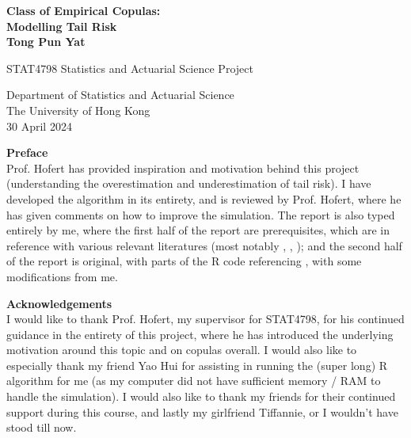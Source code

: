 \documentclass[12pt]{report}
\newcommand{\1}{\mathbf{1}}
\begin{document}
\begin{titlepage}
   \begin{center}
       \vspace*{1cm}
        \huge
       \textbf{Class of Empirical Copulas:} \\
       \huge
       \textbf{Modelling Tail Risk} \\
       \vspace{2cm}
        \LARGE
       \textbf{Tong Pun Yat}

       
        
       \vspace{7.0cm}
       \Large
       STAT4798 Statistics and Actuarial Science Project
            
       \vspace{0.8cm}
            
       Department of Statistics and Actuarial Science\\
       The University of Hong Kong\\
       30 April 2024
            
   \end{center}

\end{titlepage}

\newpage
\begin{flushleft}
\LARGE
\textbf{Preface} \\
\normalsize
\vspace{1cm}
Prof. Hofert has provided inspiration and motivation behind this project (understanding the overestimation and underestimation of tail risk). I have developed the algorithm in its entirety, and is reviewed by Prof. Hofert, where he has given comments on how to improve the simulation. The report is also typed entirely by me, where the first half of the report are prerequisites, which are in reference with various relevant literatures (most notably \cite{HofertBook}, \cite{KojadinovicYi2024Smooth}, \cite{SegersEBC}); and the second half of the report is original, with parts of the R code referencing \cite{copulaRPackage2023}, \cite{KojadinovicYi2024Smooth} with some modifications from me. 
\end{flushleft}

\newpage
\begin{flushleft}
\LARGE
\textbf{Acknowledgements} \\
\normalsize
\vspace{1cm}
I would like to thank Prof. Hofert, my supervisor for STAT4798, for his continued guidance in the entirety of this project, where he has introduced the underlying motivation around this topic and on copulas overall. I would also like to especially thank my friend Yao Hui for assisting in running the (super long) R algorithm for me (as my computer did not have sufficient memory / RAM to handle the simulation). I would also like to thank my friends for their continued support during this course, and lastly my girlfriend Tiffannie, or I wouldn't have stood till now.
\end{flushleft}
\end{document}
